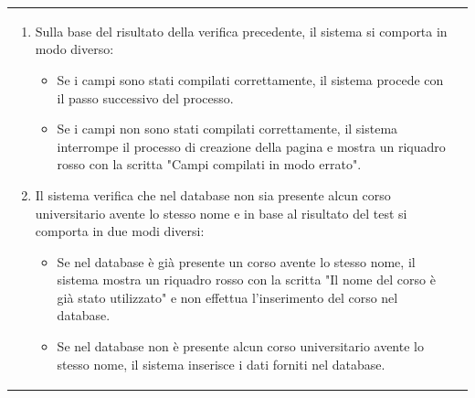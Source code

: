 \documentclass[10pt,a4paper]{report}
\begin{document}
\begin{tabular}{lp{}}
\begin{enumerate}
\begin{itemize}
			\end{itemize}
			\item Sulla base del risultato della verifica precedente, il sistema si comporta in modo diverso:
			\begin{itemize}
				\item Se i campi sono stati compilati correttamente, il sistema procede con il passo successivo del processo.
				\item Se i campi non sono stati compilati correttamente, il sistema interrompe il processo di creazione della pagina e mostra un riquadro rosso con la scritta "Campi compilati in modo errato".
			\end{itemize}
			\item Il sistema verifica che nel database non sia presente alcun corso universitario avente lo stesso nome e in base al risultato del test si comporta in due modi diversi:
			\begin{itemize}
				\item Se nel database è già presente un corso avente lo stesso nome, il sistema mostra un riquadro rosso con la scritta "Il nome del corso è già stato utilizzato" e non effettua l'inserimento del corso nel database.
				\item Se nel database non è presente alcun corso universitario avente lo stesso nome, il sistema inserisce i dati forniti nel database.
			\end{itemize}
		\end{enumerate}
	\end{tabular}
	
\end{document}
